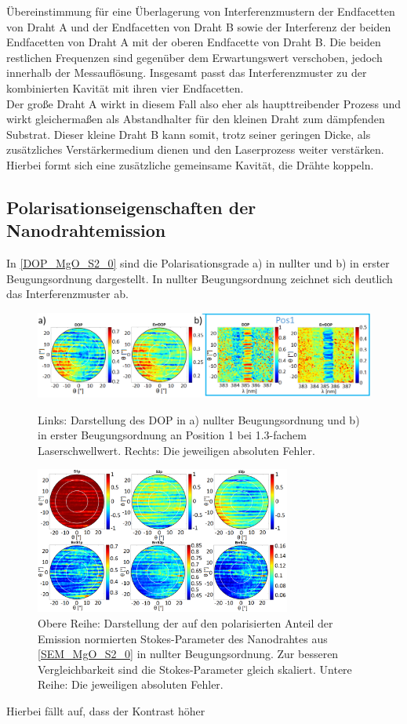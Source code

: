 Übereinstimmung für eine Überlagerung von Interferenzmustern der Endfacetten von
Draht A  und der Endfacetten von Draht B sowie der Interferenz der beiden
Endfacetten von Draht A mit der oberen Endfacette von Draht B. Die beiden
restlichen Frequenzen sind gegenüber dem Erwartungswert verschoben, jedoch
innerhalb der Messauflösung. Insgesamt passt das Interferenzmuster zu der
kombinierten Kavität mit ihren vier Endfacetten.\\ Der große Draht A wirkt in
diesem Fall also eher als haupttreibender Prozess und wirkt gleichermaßen als
Abstandhalter für den kleinen Draht zum dämpfenden Substrat. Dieser kleine Draht
B kann somit, trotz seiner geringen Dicke, als zusätzliches Verstärkermedium
dienen und den Laserprozess weiter verstärken. Hierbei formt sich eine
zusätzliche gemeinsame Kavität, die Drähte koppeln.
\subsection{Polarisationseigenschaften der Nanodrahtemission} In
\autoref{DOP_MgO_S2_0} sind die Polarisationsgrade a) in nullter und b) in
erster Beugungsordnung dargestellt. In nullter Beugungsordnung zeichnet sich
deutlich das Interferenzmuster ab.\begin{figure}[b] \centering
\includegraphics[width=1\textwidth]{Bilder/MgO/DOP_MgO_S2_0} \caption{Links:
Darstellung des DOP in a) nullter Beugungsordnung und b) in erster
Beugungsordnung an Position 1 bei 1.3-fachem Laserschwellwert. Rechts: Die
jeweiligen absoluten Fehler.} \label{DOP_MgO_S2_0}
\includegraphics[width=0.75\textwidth]{Bilder/MgO/StokesP_S2_MgO_0}
\caption{Obere Reihe: Darstellung der auf den polarisierten Anteil der Emission
normierten Stokes-Parameter des Nanodrahtes aus \autoref{SEM_MgO_S2_0} in
nullter Beugungsordnung. Zur besseren Vergleichbarkeit sind die Stokes-Parameter
gleich skaliert. Untere Reihe: Die jeweiligen absoluten Fehler.}
\label{StokesP_S2_MgO_0} \end{figure}Hierbei fällt auf, dass der Kontrast höher
